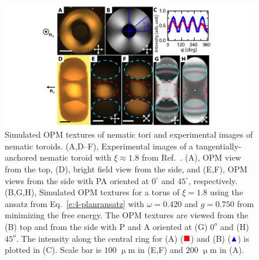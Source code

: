 \begin{figure}
\centering
\includegraphics{figures/C4/Ch4-Figs_PlanarToroids.png}
\caption{Simulated OPM textures of nematic tori and experimental images of nematic toroids. (A,D--F), Experimental images of a tangentially-anchored nematic toroid with $\xi \approx 1.8$ from Ref.~\cite{RN24}.
(A), OPM view from the top, (D), bright field view from the side, and (E,F), OPM views from the side with PA oriented at $0^{\circ}$ and $45^{\circ}$, respectively.
(B,G,H), Simulated OPM textures for a torus of $\xi = 1.8$ using the ansatz from Eq.~\ref{e:4-planransatz} with $\omega= 0.420$ and $g=0.750$ from minimizing the free energy.
The OPM textures are viewed from the (B) top and from the side with P and A oriented at (G) $0^o$ and (H) $45^o$.
The intensity along the central ring for (A) ($\color{red}\blacksquare$) and (B) ($\color{blue}\blacktriangle$) is plotted in (C).
Scale bar is $100$ $\upmu$m in (E,F) and $200$ $\upmu$m in (A).}\label{f:4-PlanarTorusComparison}
\end{figure}

